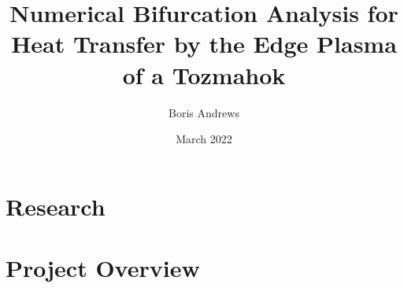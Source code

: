 \documentclass[12pt, a4paper]{report}
\title{Numerical Bifurcation Analysis for Heat Transfer by the Edge Plasma of a Tozmahok}
\author{Boris Andrews}
\affil{Mathematical Institute, University of Oxford}
\date{March 2022}
\begin{document}
    \maketitle
    
    
    
    \begin{abstract}
    \end{abstract}
    
    
    
    \newpage
    \tableofcontents
    
    
    
    \newpage
            
        \part{Research}
            
            
            
        \part{Project Overview}
            
            
    
    
    
    \newpage
        \printbibliography
\end{document}
